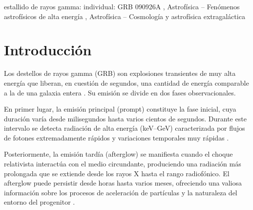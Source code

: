 \documentclass[final,5p,times,twocolumn,authoryear]{elsarticle}
\begin{document}
\begin{frontmatter}


\begin{keyword}
estallido de rayos gamma: individual: GRB 090926A \sep
Astrofísica – Fenómenos astrofísicos de alta energía \sep
Astrofísica – Cosmología y astrofísica extragaláctica





\end{keyword}


\end{frontmatter}




\section{Introducción}
\label{introduction}

Los destellos de rayos gamma (GRB) son explosiones transientes de muy alta energía que liberan, en cuestión de segundos, una cantidad de energía comparable a la de una galaxia entera \citep{kouveliotou1993,piran1999}.  Su emisión se divide en dos fases observacionales.

En primer lugar, la emisión principal (prompt) constituye la fase inicial, cuya duración varía desde milisegundos hasta varios cientos de segundos.  Durante este intervalo se detecta radiación de alta energía (keV–GeV) caracterizada por flujos de fotones extremadamente rápidos y variaciones temporales muy rápidas \citep{gehrels2009,ackermann2009}.

Posteriormente, la emisión tardía (afterglow) se manifiesta cuando el choque relativista interactúa con el medio circundante, produciendo una radiación más prolongada que se extiende desde los rayos X hasta el rango radiofónico.  El afterglow puede persistir desde horas hasta varios meses, ofreciendo una valiosa información sobre los procesos de aceleración de partículas y la naturaleza del entorno del progenitor \citep{vanparadijs2000,sari1998}.
\end{document}
